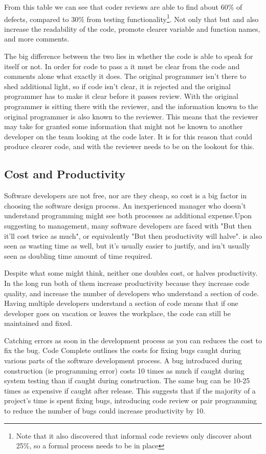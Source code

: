 \documentclass{article}
\begin{document}
From this table we can see that coder reviews are able to find about 60\% of defects, compared to 30\% from testing functionality\footnote{Note that it also discovered that informal code reviews only discover about 25\%, so a formal process needs to be in place}. Not only that but \CR and \PP also increase the readability of the code, promote clearer variable and function names, and more comments.

The big difference between the two lies in whether the code is able to speak for itself or not. In order for code to pass a \CR it must be clear from the code and comments alone what exactly it does. The original programmer isn't there to shed additional light, so if code isn't clear, it is rejected and the original programmer has to make it clear before it passes review. With \PP the original programmer is sitting there with the reviewer, and the information known to the original programmer is also known to the reviewer. This means that the reviewer may take for granted some information that might not be known to another developer on the team looking at the code later. It is for this reason that \CR could produce clearer code, and with \PP the reviewer needs to be on the lookout for this.

\subsection{Cost and Productivity}

Software developers are not free, nor are they cheap, so cost is a big factor in choosing the software design process. An inexperienced manager who doesn't understand programming might see both processes as additional expense.Upon suggesting \PP to management, many software developers are faced with "But then it'll cost twice as much", or equivalently "But then productivity will halve". \CR is also seen as wasting time as well, but it's usually easier to justify, and isn't usually seen as doubling time amount of time required.

Despite what some might think, neither one doubles cost, or halves productivity. In the long run both of them increase productivity because they increase code quality, and increase the number of developers who understand a section of code. Having multiple developers understand a section of code means that if one developer goes on vacation or leaves the workplace, the code can still be maintained and fixed.

Catching errors as soon in the development process as you can reduces the cost to fix the bug. Code Complete\cite[Table 3.1]{McConnell:2004:CCS:1096143} outlines the costs for fixing bugs caught during various parts of the software development process. A bug introduced during construction (ie programming error) costs 10 times as much if caught during system testing than if caught during construction. The same bug can be 10-25 times as expensive if caught after release. This suggests that if the majority of a project's time is spent fixing bugs, introducing code review or pair programming to reduce the number of bugs could increase productivity by 10.
\end{document}
